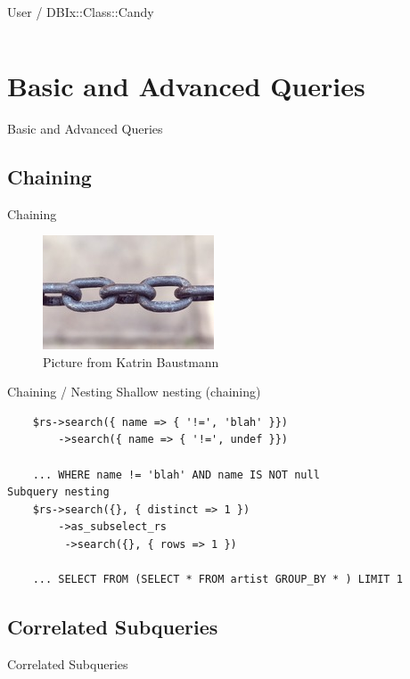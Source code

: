 \begin{frame}[fragile]{User / DBIx::Class::Candy}
\begin{lstlisting}

\end{lstlisting}
\end{frame}

\section{Basic and Advanced Queries}
\begin{frame}{Basic and Advanced Queries}
\end{frame}

\subsection{Chaining}

\begin{frame}{Chaining}
\begin{figure}
\includegraphics{img/chains.jpg}
\caption[Chains]{Picture from Katrin Baustmann}
\end{figure}
\end{frame}


\begin{frame}[fragile]{Chaining / Nesting}
Shallow nesting (chaining)
\begin{lstlisting}
    $rs->search({ name => { '!=', 'blah' }})
        ->search({ name => { '!=', undef }})

    ... WHERE name != 'blah' AND name IS NOT null
Subquery nesting
    $rs->search({}, { distinct => 1 })
        ->as_subselect_rs
         ->search({}, { rows => 1 })

    ... SELECT FROM (SELECT * FROM artist GROUP_BY * ) LIMIT 1
\end{lstlisting}
\end{frame}

\subsection{Correlated Subqueries}
\begin{frame}{Correlated Subqueries}
\end{frame}

